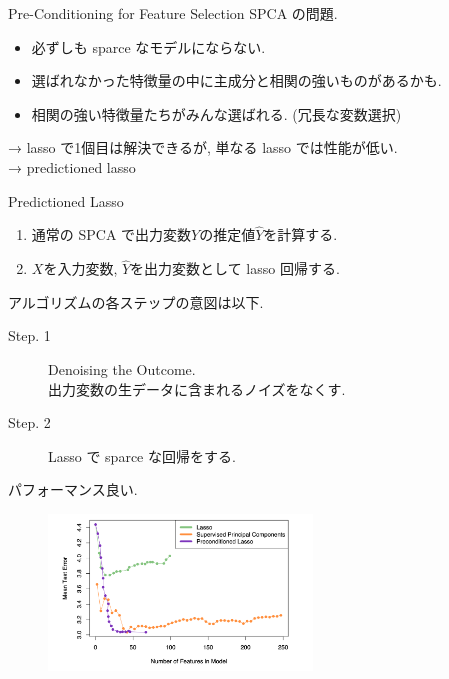 \documentclass[dvipdfmx,8pt]{beamer}
\begin{document}
  \begin{frame}{Pre-Conditioning for Feature Selection}
    SPCA の問題.
    \begin{itemize}
      \item 必ずしも sparce なモデルにならない.
      \item 選ばれなかった特徴量の中に主成分と相関の強いものがあるかも.
      \item 相関の強い特徴量たちがみんな選ばれる. (冗長な変数選択)
    \end{itemize}
    → lasso で1個目は解決できるが, 単なる lasso では性能が低い. \\
    → predictioned lasso
  \end{frame}
  \begin{frame}{Predictioned Lasso}
    \begin{enumerate}
      \item 通常の SPCA で出力変数$Y$の推定値$\hat{Y}$を計算する.
      \item $X$を入力変数, $\hat{Y}$を出力変数として lasso 回帰する.
    \end{enumerate}
    アルゴリズムの各ステップの意図は以下.
    \begin{description}
      \item[Step. 1] Denoising the Outcome. \\出力変数の生データに含まれるノイズをなくす.
      \item[Step. 2] Lasso で sparce な回帰をする.
    \end{description}

    \vspace{\baselineskip}

    パフォーマンス良い.
    \begin{figure}[htb]
      \centering
      \includegraphics[width=7cm]{./images/plasso-performance.png}
    \end{figure}
  \end{frame}
\end{document}
